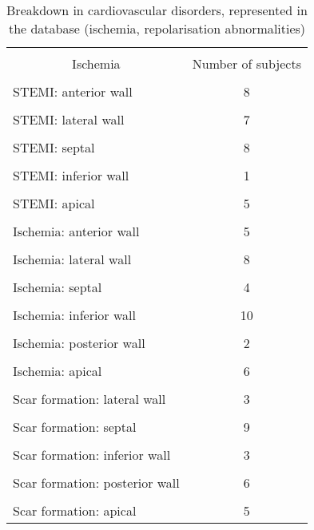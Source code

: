 \documentclass[submitted]{ieeeaccess}
\begin{document}
\begin{table}
\centering
		\caption{Breakdown in cardiovascular disorders, represented in the database (ischemia, repolarisation abnormalities)}
        \begin{adjustbox}{width=1\linewidth}
    		\begin{tabular}{|l|c|}
			\hline
			&\\[-1em]
			\multicolumn{1}{c|}{Ischemia} &{Number of subjects} \\
			\hline
			&\\[-1em]
			STEMI: anterior wall & 8 \\
			\hline
			&\\[-1em]
			STEMI: lateral wall & 7 \\
			\hline
			&\\[-1em]
			STEMI: septal & 8 \\
			\hline
			&\\[-1em]
			STEMI: inferior wall & 1 \\
			\hline
			&\\[-1em]
			STEMI: apical & 5 \\
			\hline
			&\\[-1em]
			Ischemia: anterior wall & 5 \\
			\hline
			&\\[-1em]
			Ischemia: lateral wall & 8 \\
			\hline
			&\\[-1em]
			Ischemia: septal & 4 \\
			\hline
			&\\[-1em]
			Ischemia: inferior wall & 10 \\
			\hline
			&\\[-1em]
			Ischemia: posterior wall & 2 \\
			\hline
			&\\[-1em]
			Ischemia: apical & 6 \\
			\hline
			&\\[-1em]
			Scar formation: lateral wall & 3 \\
			\hline
			&\\[-1em]
			Scar formation: septal & 9 \\
			\hline
			&\\[-1em]
			Scar formation: inferior wall & 3 \\
			\hline
			&\\[-1em]
			Scar formation: posterior wall & 6 \\
			\hline
			&\\[-1em]
			Scar formation: apical & 5 \\

\end{tabular}
\end{adjustbox}
\end{table}
\end{document}

